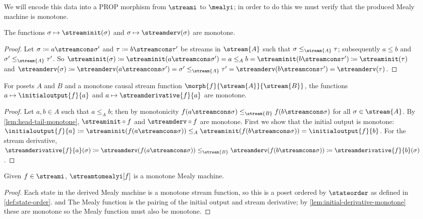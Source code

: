 \documentclass{lmcs}
\begin{document}
We will encode this data into a PROP morphism from \(\streami\) to \(\mealyi\);
in order to do this we must verify that the produced Mealy machine is monotone.

\begin{lem}\label{lem:head-tail-monotone}
    The functions \(\sigma \mapsto \streaminit(\sigma)\) and
    \(\sigma \mapsto \streamderv(\sigma)\) are monotone.
\end{lem}
\begin{proof}
    Let \(\sigma \coloneqq a \streamcons \sigma^\prime\) and
    \(\tau \coloneqq b \streamcons \tau^\prime\) be streams in \(\stream{A}\)
    such that \(\sigma \leq_{\stream{A}} \tau\); subsequently \(a \leq b\) and
    \(\sigma^\prime \leq_{\stream{A}} \tau^\prime\).
    So \(
    \streaminit(\sigma) \coloneqq
    \streaminit(a \streamcons \sigma^\prime) =
    a \leq_{A}
    b =
    \streaminit(b \streamcons \tau^\prime) \coloneqq
    \streaminit(\tau)
    \) and \(
    \streamderv(\sigma) \coloneqq
    \streamderv(a \streamcons \sigma^\prime) =
    \sigma^\prime \leq_{\stream{A}}
    \tau^\prime =
    \streamderv(b \streamcons \tau^\prime) =
    \streamderv(\tau)
    \).
\end{proof}

\begin{lem}\label{lem:initial-derivative-monotone}
    For posets \(A\) and \(B\) and a monotone causal stream function
    \(\morph{f}{\stream{A}}{\stream{B}}\), the functions
    \(a \mapsto \initialoutput{f}{a}\) and \(a \mapsto \streamderivative{f}{a}\)
    are monotone.
\end{lem}
\begin{proof}
    Let \(a, b \in A\) such that \(a \leq_A b\); then by monotonicity
    \(f(a \streamcons \sigma) \leq_{\stream{B}} f(b \streamcons \sigma)\) for
    all \(\sigma \in \stream{A}\).
    By \autoref{lem:head-tail-monotone}, \(\streaminit \circ f\) and
    \(\streamderv \circ f\) are monotone.
    First we show that the initial output is monotone: \(
    \initialoutput{f}{a} \coloneqq
    \streaminit(f(a \streamcons \sigma)) \leq_{A}
    \streaminit(f(b \streamcons \sigma)) =
    \initialoutput{f}{b}
    \).
    For the stream derivative, \(
    \streamderivative{f}{a}(\sigma) \coloneqq
    \streamderv(f(a \streamcons \sigma)) \leq_{\stream{B}}
    \streamderv(f(b \streamcons \sigma)) \coloneqq
    \streamderivative{f}{b}(\sigma)
    \).
\end{proof}

\begin{lem}\label{lem:stream-to-mealy-is-monotone}
    Given \(f \in \streami\), \(\streamtomealyi[f]\) is
    a monotone Mealy machine.
\end{lem}
\begin{proof}
    Each state in the derived Mealy machine is a monotone stream function, so
    this is a poset ordered by \(\stateorder\) as defined in
    \autoref{def:state-order}. and
    The Mealy function is the pairing of the initial output and stream
    derivative; by \autoref{lem:initial-derivative-monotone} these are monotone so
    the Mealy function must also be monotone.
\end{proof}
\end{document}
